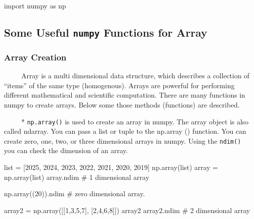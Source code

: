 \documentclass[
  letterpaper,
  DIV=11,
  numbers=noendperiod]{scrreprt}
\newenvironment{Shaded}{\begin{snugshade}}{\end{snugshade}}
\newcommand{\BuiltInTok}[1]{\textcolor[rgb]{0.00,0.23,0.31}{#1}}
\newcommand{\CommentTok}[1]{\textcolor[rgb]{0.37,0.37,0.37}{#1}}
\newcommand{\DecValTok}[1]{\textcolor[rgb]{0.68,0.00,0.00}{#1}}
\newcommand{\ImportTok}[1]{\textcolor[rgb]{0.00,0.46,0.62}{#1}}
\newcommand{\NormalTok}[1]{\textcolor[rgb]{0.00,0.23,0.31}{#1}}
\newcommand{\OperatorTok}[1]{\textcolor[rgb]{0.37,0.37,0.37}{#1}}
\begin{document}
\begin{Shaded}
\begin{Highlighting}[]
\ImportTok{import}\NormalTok{ numpy }\ImportTok{as}\NormalTok{ np}
\end{Highlighting}
\end{Shaded}

\subsection{\texorpdfstring{Some Useful \texttt{numpy} Functions for
Array}{Some Useful numpy Functions for Array}}\label{some-useful-numpy-functions-for-array}

\subsubsection{Array Creation}\label{array-creation}

~~~~~Array is a multi dimensional data structure, which describes a
collection of ``items'' of the same type (homogenous). Arrays are
powerful for performing different mathematical and scientific
computation. There are many functions in numpy to create arrays. Below
some those methods (functions) are described.

~~~~~* \texttt{np.array()} is used to create an array in numpy. The
array object is also called ndarray. You can pass a list or tuple to the
np.array () function. You can create zero, one, two, or three
dimensional arrays in numpy. Using the \texttt{ndim()} you can check the
dimension of an array.

\begin{Shaded}
\begin{Highlighting}[]
\BuiltInTok{list} \OperatorTok{=}\NormalTok{ [}\DecValTok{2025}\NormalTok{, }\DecValTok{2024}\NormalTok{, }\DecValTok{2023}\NormalTok{, }\DecValTok{2022}\NormalTok{, }\DecValTok{2021}\NormalTok{, }\DecValTok{2020}\NormalTok{, }\DecValTok{2019}\NormalTok{]}
\NormalTok{np.array(}\BuiltInTok{list}\NormalTok{)}
\NormalTok{array }\OperatorTok{=}\NormalTok{ np.array(}\BuiltInTok{list}\NormalTok{)}
\NormalTok{array.ndim }\CommentTok{\# 1 dimensional array}

\NormalTok{np.array((}\DecValTok{20}\NormalTok{)).ndim }\CommentTok{\# zero dimensional array. }

\NormalTok{array2 }\OperatorTok{=}\NormalTok{ np.array([[}\DecValTok{1}\NormalTok{,}\DecValTok{3}\NormalTok{,}\DecValTok{5}\NormalTok{,}\DecValTok{7}\NormalTok{], [}\DecValTok{2}\NormalTok{,}\DecValTok{4}\NormalTok{,}\DecValTok{6}\NormalTok{,}\DecValTok{8}\NormalTok{]])}
\NormalTok{array2}
\NormalTok{array2.ndim }\CommentTok{\# 2 dimensional array}
\end{Highlighting}
\end{Shaded}
\end{document}
